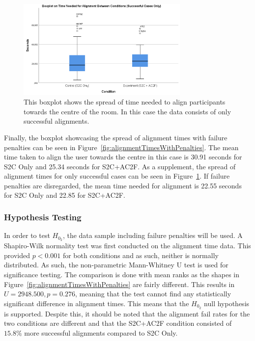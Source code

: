 \begin{figure}[tbph]
    \centering
    \includegraphics[width=0.75\textwidth]{figures/graphs/boxplotAlignmentTimesWithoutPenalties.png}
    \caption[Boxplot on Time Needed To Align Participants To Centre (Successful Cases Only)]{This boxplot shows the spread of time needed to align participants towards the centre of the room. In this case the data consists of only successful alignments.}
    \label{fig:AlignmentTimesWithoutPenalties}
\end{figure}

Finally, the boxplot showcasing the spread of alignment times with failure penalties can be seen in Figure~\ref{fig:alignmentTimesWithPenalties}. The mean time taken to align the user towards the centre in this case is 30.91 seconds for S2C Only and 25.34 seconds for S2C+AC2F. As a supplement, the spread of alignment times for only successful cases can be seen in Figure~\ref{fig:AlignmentTimesWithoutPenalties}. If failure penalties are disregarded, the mean time needed for alignment is 22.55 seconds for S2C Only and 22.85 for S2C+AC2F. 

\subsubsection{Hypothesis Testing}
In order to test $H_{0_2}$, the data sample including failure penalties will be used. A Shapiro-Wilk normality test was first conducted on the alignment time data. This provided $p < 0.001$ for both conditions and as such, neither is normally distributed. As such, the non-parametric Mann-Whitney U test is used for significance testing. The comparison is done with mean ranks as the shapes in Figure~\ref{fig:alignmentTimesWithPenalties} are fairly different. This results in $U = 2948.500, p = 0.276$, meaning that the test cannot find any statistically significant difference in alignment times. This means that the $H_{0_2}$ null hypothesis is supported. Despite this, it should be noted that the alignment fail rates for the two conditions are different and that the S2C+AC2F condition consisted of $15.8\%$ more successful alignments compared to S2C Only. 

